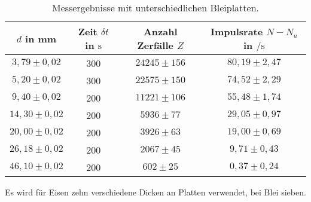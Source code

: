 \begin{table}
  \centering
  \caption{Messergebnisse mit unterschiedlichen Bleiplatten.}
  \label{tab:1aPb}
  \begin{tabular}{c c c c}
    $d$ in \si{\milli\meter} & Zeit $\delta t$ in $\si{\second}$ & Anzahl Zerfälle $Z$  &  Impulsrate $N-N_u$ in $\si{\per\second}$\\
       \midrule
        $3,79 \pm 0,02$   &  300   &  $24245 \pm 156$ & $80,19 \pm 2,47$ \\
        $5,20 \pm 0,02$   &  300   &  $22575 \pm 150$ & $74,52 \pm 2,29$\\
        $9,40 \pm 0,02$   &  200   &  $11221 \pm 106$ & $55,48 \pm 1,74$\\
        $14,30 \pm 0,02$  &  200   &  $5936  \pm 77$ & $29,05 \pm 0,97$\\
        $20,00 \pm 0,02$  &  200   &  $3926  \pm 63$ & $19,00 \pm 0,69$\\
        $26,18 \pm 0,02$  &  200   &  $2067  \pm 45$ & $9,71 \pm 0,43$\\
        $46,10 \pm 0,02$  &  200   &  $602   \pm 25$ & $0,37 \pm 0,24$\\
      \bottomrule
    \end{tabular}
\end{table}

Es wird für Eisen zehn verschiedene Dicken an Platten verwendet, bei Blei sieben.\\

